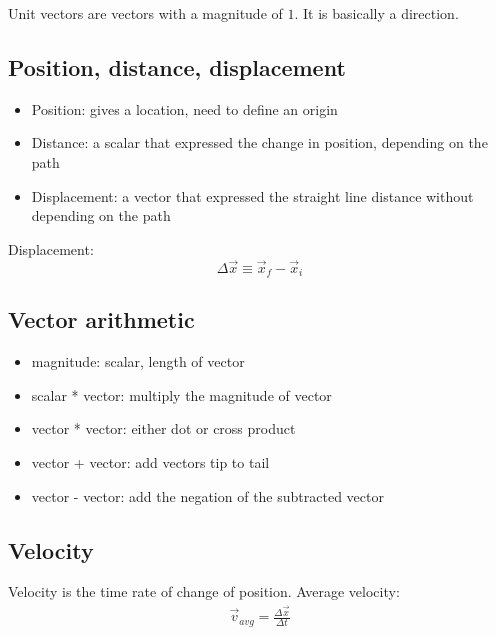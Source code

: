 \documentclass{article}
\theoremstyle{mytheoremstyle}
\theoremstyle{mytheoremstyle}
\theoremstyle{myproblemstyle}
\begin{document}
    Unit vectors are vectors with a magnitude of $1$. It is basically a
    direction.

    \subsection*{Position, distance, displacement}
    \begin{itemize}
        \item Position: gives a location, need to define an origin

        \item Distance: a scalar that expressed the change in position,
            depending on the path

        \item Displacement: a vector that expressed the straight line distance
            without depending on the path
    \end{itemize}

    Displacement:
    \begin{equation*}
        \Delta \vec{x} \equiv \vec{x}_f - \vec{x}_i
    \end{equation*}

    \subsection*{Vector arithmetic}
    \begin{itemize}
        \item magnitude: scalar, length of vector

        \item scalar * vector: multiply the magnitude of vector

        \item vector * vector: either dot or cross product

        \item vector + vector: add vectors tip to tail

        \item vector - vector: add the negation of the subtracted vector
    \end{itemize}

    \subsection*{Velocity}
    Velocity is the time rate of change of position. Average velocity:
    \begin{align*}
        \vec{v}_{avg}=\frac{\Delta \vec{x}}{\Delta t}
    \end{align*}
\end{document}
